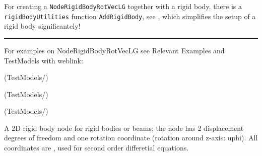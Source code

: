     For creating a \texttt{NodeRigidBodyRotVecLG} together with a rigid body, there is a \texttt{rigidBodyUtilities} function \texttt{AddRigidBody}, 
    see , which simplifies the setup of a rigid body significantely!
\vspace{6pt}\par\noindent\rule{\textwidth}{0.4pt}
%
\noindent For examples on NodeRigidBodyRotVecLG see Relevant Examples and TestModels with weblink:
\bi
\item {} (TestModels/)
\item {} (TestModels/)
\item {} (TestModels/)

\ei

%
\newpage


\label{sec:item:NodeRigidBody2D}
A 2D rigid body node for rigid bodies or beams; the node has 2 displacement degrees of freedom and one rotation coordinate (rotation around z-axis: uphi). All coordinates are , used for second order differetial equations.
\vspace{12pt}\\

